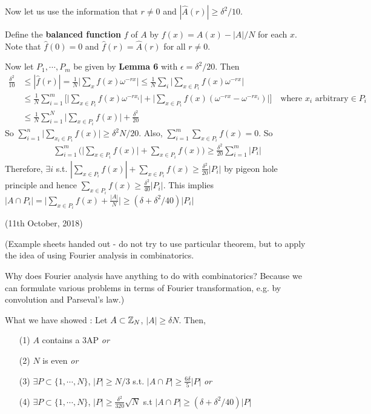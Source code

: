\documentclass[12pt,a4paper]{report}
\renewcommand{\hat}{\widehat}
\begin{document}
Now let us use the  information that $r\neq 0$ and $|\hat{A}(r) | \geq \delta^2/10$.

Define the \textbf{balanced function} $f$ of $A$ by $f(x) = A(x) - |A|/N$ for each $x$. Note that $\hat{f}(0) =0 $ and $\hat{f}(r) = \hat{A}(r)$ for all $r\neq 0$.

Now let $P_1, \cdots, P_m$ be given by \textbf{Lemma 6} with $\epsilon = \delta^2/20$. Then
\begin{align*}
\frac{\delta^2}{10} &\leq |\hat{f}(r)| = \frac{1}{N} \big| \sum_x f(x) \omega^{-rx} \big| \leq \frac{1}{N} \sum_i \big| \sum_{x\in P_i}  f(x) \omega^{-rx} \big | \\
&\leq \frac{1}{N} \sum_{i=1}^m \Big[ \big| \sum_{x\in P_i} f(x) \omega^{-rx_i} \big| + \big| \sum_{x\in P_i} f(x)(\omega^{-rx} - \omega^{-rx_i})   \big|     \Big] \quad \text{where } x_i \text{ arbitrary} \in P_i \\
&\leq \frac{1}{N} \sum_{i=1}^N \big| \sum_{x\in P_i} f(x) \big| + \frac{\delta^2}{20}
\end{align*}
So $\sum_{i=1}^n \big| \sum_{x_i\in P_i} f(x) \big| \geq \delta^2 N/20$. Also, $\sum_{i=1}^m \sum_{x\in P_i} f(x) =0$. So
\begin{align*}
\sum_{i=1}^m \Big(  \big| \sum_{x\in P_i} f(x) \big| + \sum_{x\in P_i}f(x) \Big) \geq \frac{\delta^2}{20} \sum_{i=1}^m |P_i|
\end{align*}
Therefore, $\exists i$ s.t. $|\sum_{x\in P_i} f(x) | + \sum_{x\in P_i}f(x) \geq \frac{\delta^2}{20} |P_i|$ by pigeon hole principle and hence $\sum_{x\in P_i}f(x) \geq \frac{\delta^2}{40}|P_i|$. This implies $|A\cap P_i | = \big| \sum_{x\in P_i} f(x) + \frac{|A|}{N}  \big|   \geq (\delta + \delta^2/40)|P_i|$
\s

\newday

(11th October, 2018)
\s

(Example sheets handed out - do not try to use particular theorem, but to apply the idea of using Fourier analysis in combinatorics.

Why does Fourier analysis have anything to do with combinatorics? Because we can formulate various problems in terms of Fourier transformation, e.g. by convolution and Parseval's law.)
\s

\bull What we have showed : Let $A \subset \mathbb{Z}_N$, $|A|\geq \delta N$. Then,
\begin{itemize}
\item[(1)] $A$ contains a 3AP \emph{or}
\item[(2)] $N$ is even \emph{or}
\item[(3)] $\exists P \subset \{ 1,\cdots, N\}$, $|P|\geq N/3$ s.t. $|A\cap P| \geq \frac{6\delta}{5} |P|$ \emph{or}
\item[(4)] $\exists P \subset \{1,\cdots, N\}$, $|P| \geq \frac{\delta^2}{320} \sqrt{N}$ s.t $|A\cap P| \geq (\delta + \delta^2/40)|P|$
\end{itemize}
\end{document}
